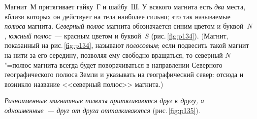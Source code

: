 \documentclass[main.tex]{subfiles}
\begin{document}
Магнит~М притягивает гайку~Г и шайбу~Ш. У всякого магнита есть \emph{два} места, вблизи которых он действует на тела наиболее сильно; это так называемые \emph{полюса} магнита. \emph{Северный полюс} магнита обозначается синим цветом и буквой~$N$, \emph{южный полюс}~--- красным
цветом и буквой~$S$ (рис.\,\ref{fig:p134}). (Магнит, показанный на рис.\,\ref{fig:p134}, называют \emph{полосовым}; если подвесить такой магнит на нити за его середину, позволяя ему свободно вращаться, то северный $N$"=полюс магнита всегда будет поворачиваться в направлении Северного географического полюса Земли и указывать на географический север: отсюда и возникло название <<северный полюс>> магнита.)

\emph{Разноименные магнитные полюсы притягиваются друг к другу, а одноименные~--- друг от друга отталкиваются} (рис.\,\ref{fig:p135}).
\end{document}
